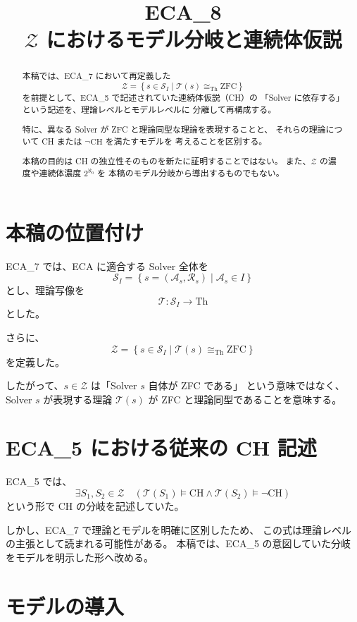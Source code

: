 \documentclass[a4paper,11pt]{jsarticle}
\title{ECA_8\\$\mathcal{Z}$ におけるモデル分岐と連続体仮説}
\author{}
\date{}
\newcommand{\Solver}{\mathcal{S}}
\newcommand{\Th}{\mathrm{Th}}
\begin{document}
\maketitle

\begin{abstract}
本稿では、ECA_7 において再定義した
\[
\mathcal{Z}=
\left\{s\in\Solver_I\mid
\mathcal{T}(s)\cong_{\mathrm{Th}}\mathrm{ZFC}\right\}
\]
を前提として、ECA_5 で記述されていた連続体仮説（CH）の
「Solver に依存する」という記述を、理論レベルとモデルレベルに
分離して再構成する。

特に、異なる Solver が ZFC と理論同型な理論を表現することと、
それらの理論について CH または $\neg\mathrm{CH}$ を満たすモデルを
考えることを区別する。

本稿の目的は CH の独立性そのものを新たに証明することではない。
また、$\mathcal{Z}$ の濃度や連続体濃度 $2^{\aleph_0}$ を
本稿のモデル分岐から導出するものでもない。
\end{abstract}

\section{本稿の位置付け}

ECA_7 では、ECA に適合する Solver 全体を
\[
\Solver_I=
\left\{s=(\mathcal{A}_s,\mathcal{R}_s)\mid
\mathcal{A}_s\in I\right\}
\]
とし、理論写像を
\[
\mathcal{T}:\Solver_I\longrightarrow\Th
\]
とした。

さらに、
\[
\mathcal{Z}=
\left\{s\in\Solver_I\mid
\mathcal{T}(s)\cong_{\mathrm{Th}}\mathrm{ZFC}\right\}
\]
を定義した。

したがって、$s\in\mathcal{Z}$ は「Solver $s$ 自体が ZFC である」
という意味ではなく、Solver $s$ が表現する理論
$\mathcal{T}(s)$ が ZFC と理論同型であることを意味する。

\section{ECA_5 における従来の CH 記述}

ECA_5 では、
\[
\exists S_1,S_2\in\mathcal{Z}\quad
\left(
\mathcal{T}(S_1)\models\mathrm{CH}
\land
\mathcal{T}(S_2)\models\neg\mathrm{CH}
\right)
\]
という形で CH の分岐を記述していた。

しかし、ECA_7 で理論とモデルを明確に区別したため、
この式は理論レベルの主張として読まれる可能性がある。
本稿では、ECA_5 の意図していた分岐をモデルを明示した形へ改める。

\section{モデルの導入}
\end{document}
